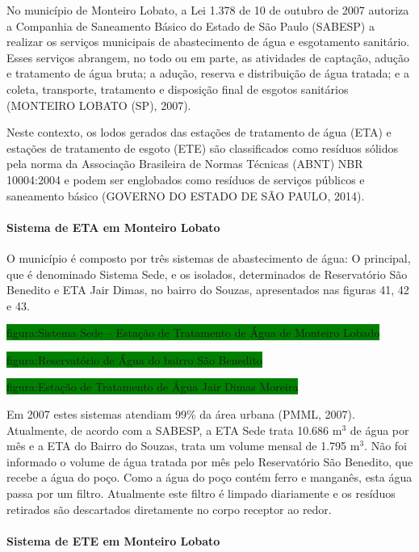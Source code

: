 	No município de Monteiro Lobato, a Lei 1.378 de 10 de outubro de 2007 autoriza a Companhia de Saneamento Básico do Estado de São Paulo (SABESP) a realizar os serviços municipais de abastecimento de água e esgotamento sanitário. Esses serviços abrangem, no todo ou em parte, as atividades de captação, adução e tratamento de água bruta; a adução, reserva e distribuição de água tratada; e a coleta, transporte, tratamento e disposição final de esgotos sanitários (MONTEIRO LOBATO (SP), 2007).

	Neste contexto, os lodos gerados das estações de tratamento de água (ETA) e estações de tratamento de esgoto (ETE) são classificados como resíduos sólidos pela norma da Associação Brasileira de Normas Técnicas (ABNT) NBR 10004:2004 e podem ser englobados como resíduos de serviços públicos e saneamento básico (GOVERNO DO ESTADO DE SÃO PAULO, 2014).
	
	\paragraph{\textbf{Sistema de ETA em Monteiro Lobato}}
	
	O município é composto por três sistemas de abastecimento de água: O principal, que é denominado Sistema Sede, e os isolados, determinados de Reservatório São Benedito e ETA Jair Dimas, no bairro do Souzas, apresentados nas figuras 41, 42 e 43. 
	
	\colorbox{green}{figura:Sistema Sede – Estação de Tratamento de Água de Monteiro Lobado}
	
	\colorbox{green}{figura:Reservatório de Água do bairro São Benedito}
	
	\colorbox{green}{figura:Estação de Tratamento de Água Jair Dimas Moreira}
	
	Em 2007 estes sistemas atendiam 99\% da área urbana (PMML, 2007). Atualmente, de acordo com a SABESP, a ETA Sede trata 10.686 m$^{3}$ de água por mês e a ETA do Bairro do Souzas, trata um volume mensal de 1.795 m$^{3}$. Não foi informado o volume de água tratada por mês pelo Reservatório São Benedito, que recebe a água do poço. Como a água do poço contém ferro e manganês, esta água passa por um filtro. Atualmente este filtro é limpado diariamente e os resíduos retirados são descartados diretamente no corpo receptor ao redor.
	
	\paragraph{\textbf{Sistema de ETE em Monteiro Lobato}}
	
